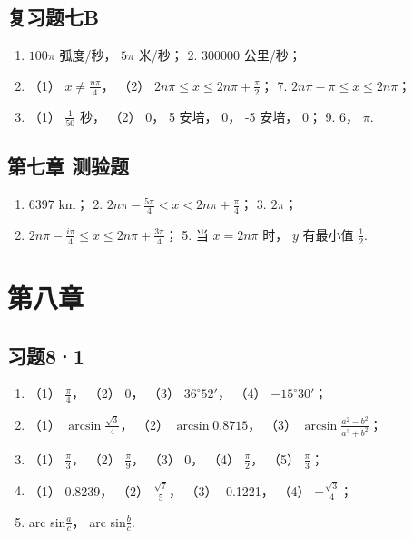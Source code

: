 \subsection{复习题七B}

\begin{enumerate}
\item
  \(100\pi\) 弧度/秒， \(5\pi\) 米/秒； 2. 300000 公里/秒；
\item
  （1） \(x \neq \frac{n\pi}{4}\)， （2）
  \(2n\pi \leqslant x \leqslant 2n\pi + \frac{\pi}{2}\)； 7.
  \(2n\pi - \pi \leqslant x \leqslant 2n\pi\)；
\item
  （1） \(\frac{1}{50}\) 秒， （2） 0， 5 安培， 0， -5 安培， 0； 9.
  6， \(\pi\).
\end{enumerate}

\subsection{第七章 测验题}

\begin{enumerate}
\item
  6397 km； 2. \(2n\pi - \frac{5\pi}{4} < x < 2n\pi + \frac{\pi}{4}\)；
  3. \(2\pi\)；
\item
  \(2n\pi - \frac{i\pi}{4} \leqslant x \leqslant 2n\pi + \frac{3\pi}{4}\)；
  5. 当 \(x = 2n\pi\) 时， \(y\) 有最小值 \(\frac{1}{2}\).
\end{enumerate}

\section{第八章}

\subsection{习题8·1}

\begin{enumerate}
\item
  （1） \(\frac{\pi}{4}\)， （2） 0， （3） \(36^{\circ}52'\)， （4）
  \(-15^{\circ}30'\)；
\item
  （1） \(\arcsin \frac{\sqrt{3}}{4}\)， （2） \(\arcsin 0.8715\)，
  （3） \(\arcsin \frac{a^2 - b^2}{a^2 + b^2}\)；
\item
  （1） \(\frac{\pi}{3}\)， （2） \(\frac{\pi}{9}\)， （3） 0， （4）
  \(\frac{\pi}{2}\)， （5） \(\frac{\pi}{3}\)；
\item
  （1） 0.8239， （2） \(\frac{\sqrt{7}}{5}\)， （3） -0.1221， （4）
  \(-\frac{\sqrt{3}}{4}\)；
\item
  arc sin\(\frac{a}{c}\)， arc sin\(\frac{b}{c}\).
\end{enumerate}

